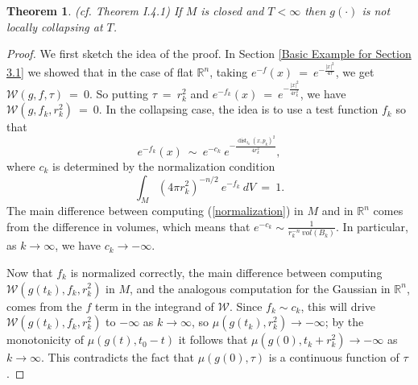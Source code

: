 \documentclass[12pt]{amsart}
\newcommand{\dist}{\operatorname{dist}}
\newcommand{\R}{{\mathbb R}}
\newcommand{\ra}{\rightarrow}
\numberwithin{equation}{section}
\theoremstyle{plain}
\newtheorem{theorem}[equation]{Theorem}
\theoremstyle{definition}
\theoremstyle{remark}
\begin{document}
\begin{theorem} \label{noncollthm} (cf. Theorem I.4.1)
If $M$ is closed and $T < \infty$ then $g(\cdot)$ is not locally
collapsing at $T$.
\end{theorem}
\begin{proof}
We first sketch the idea of the proof.
In Section \ref{Basic Example for Section 3.1} we showed that in the
case of flat $\R^n$, taking $e^{-f}(x) \: = \:
e^{- \frac{|x|^2}{4\tau}}$, we get ${\mathcal W}(g, f, \tau) \: = \: 0$.
So putting $\tau \: = \: r_k^2$ and $e^{-f_k}(x) \: = \:
e^{- \frac{|x|^2}{4r_k^2}}$, we have ${\mathcal W}(g, f_k, r_k^2) \: = \: 0$.
In the collapsing case, the idea is to use a test function $f_k$ so that
\begin{equation}
e^{-f_k}(x) \: \sim \:
e^{- c_k} \: e^{- \frac{\dist_{t_k}(x, p_k)^2}{4r_k^2}},
\end{equation}
where $c_k$ is determined by the normalization condition
\begin{equation} \label{normalization}
\int_M (4 \pi r_k^2)^{- n/2} \: e^{-f_k} \: dV \: = \: 1.
\end{equation} 
The main difference between computing (\ref{normalization}) in $M$ and
in $\R^n$ comes from the difference in volumes, which means that
$e^{-c_k} \sim \frac{1}{r_k^{-n} \: vol(B_k)}$. 
In particular, as $k \rightarrow
\infty$, we have $c_k \rightarrow - \infty$. 

Now that $f_k$ is normalized correctly, the main difference between
computing ${\mathcal W}(g(t_k), f_k, r_k^2)$ in $M$, and the
analogous computation for the
Gaussian in $\R^n$,
comes from the $f$ term in the integrand of ${\mathcal W}$.  Since
$f_k \sim c_k$, this will drive ${\mathcal W}(g(t_k), f_k, r_k^2)$ to
$- \infty$ as $k \rightarrow \infty$, so $\mu(g(t_k), r_k^2)
\rightarrow - \infty$; by the monotonicity of $\mu(g(t),t_0-t)$
it follows that $\mu(g(0),t_k+r_k^2)\ra -\infty$ as $k\ra \infty$.
This contradicts the fact that $\mu(g(0),\tau)$ is a continuous function 
of $\tau$.


\end{proof}
\end{document}
